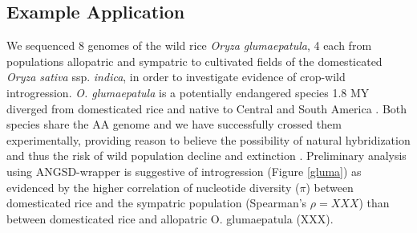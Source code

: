 \documentclass[final]{beamer}
\begin{document}
\begin{frame}[t]
\begin{multicols}{3}
%         
%		

\section{Example Application}

We sequenced 8 genomes of the wild rice \emph{Oryza glumaepatula}, 4 each from populations allopatric and sympatric to cultivated fields of the domesticated \emph{Oryza sativa} ssp. \emph{indica}, in order to investigate evidence of crop-wild introgression. 
\emph{O. glumaepatula} is a potentially endangered species 1.8 MY diverged from domesticated rice \cite{Zhang} and native to Central and South America \cite{Vaughan}. 
Both species share the AA genome \cite{Vaughan} and we have successfully crossed them experimentally, providing reason to believe the possibility of natural hybridization and thus the risk of wild population decline and extinction \cite{Rhymer}. 
Preliminary analysis using ANGSD-wrapper is suggestive of introgression (Figure \ref{gluma}) as evidenced by the higher correlation of nucleotide diversity ($\pi$) between domesticated rice and the sympatric population (Spearman's $\rho=XXX$) than between domesticated rice and allopatric O. glumaepatula (XXX).


\end{multicols}
\end{frame}
\end{document}
